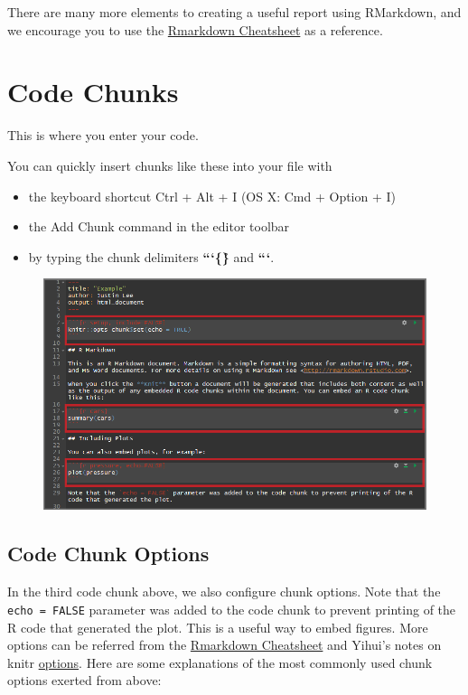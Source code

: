\documentclass[]{book}
\providecommand{\tightlist}{%
  \setlength{\itemsep}{0pt}\setlength{\parskip}{0pt}}
\theoremstyle{definition}
\theoremstyle{definition}
\theoremstyle{remark}
\begin{document}
There are many more elements to creating a useful report using
RMarkdown, and we encourage you to use the
\href{https://www.rstudio.com/wp-content/uploads/2015/02/rmarkdown-cheatsheet.pdf}{Rmarkdown
Cheatsheet} as a reference.

\section{Code Chunks}\label{code-chunks}

This is where you enter your code.

You can quickly insert chunks like these into your file with

\begin{itemize}
\tightlist
\item
  the keyboard shortcut Ctrl + Alt + I (OS X: Cmd + Option + I)
\item
  the Add Chunk command in the editor toolbar
\item
  by typing the chunk delimiters \textbf{```\{\r\}} and \textbf{```}.
\end{itemize}

\begin{figure}[htbp]
\centering
\includegraphics{images/rmd_code_chunk.png}
\caption{}
\end{figure}

\subsection{Code Chunk Options}\label{code-chunk-options}

In the third code chunk above, we also configure chunk options. Note
that the \texttt{echo\ =\ FALSE} parameter was added to the code chunk
to prevent printing of the R code that generated the plot. This is a
useful way to embed figures. More options can be referred from the
\href{https://www.rstudio.com/wp-content/uploads/2015/02/rmarkdown-cheatsheet.pdf}{Rmarkdown
Cheatsheet} and Yihui's notes on knitr
\href{https://yihui.name/knitr/options/}{options}. Here are some
explanations of the most commonly used chunk options exerted from above:
\end{document}
